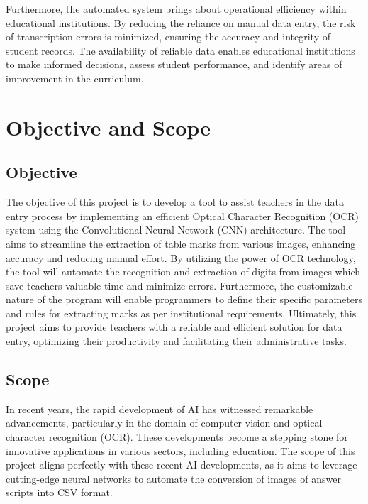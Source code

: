 \noindent Furthermore, the automated system brings about operational efficiency within educational institutions. By reducing the reliance on manual data entry, the risk of transcription errors is minimized, ensuring the accuracy and integrity of student records. The availability of reliable data enables educational institutions to make informed decisions, assess student performance, and identify areas of improvement in the curriculum.
\clearpage

\section{Objective and Scope}

\subsection{Objective}

The objective of this project is to develop a tool to assist teachers in the data entry process by implementing an efficient Optical Character Recognition (OCR) system using the Convolutional Neural Network (CNN) architecture. The tool aims to streamline the extraction of table marks from various images, enhancing accuracy and reducing manual effort. By utilizing the power of OCR technology, the tool will automate the recognition and extraction of digits from images which save teachers valuable time and minimize errors. Furthermore, the customizable nature of the program will enable programmers to define their specific parameters and rules for extracting marks as per institutional requirements. Ultimately, this project aims to provide teachers with a reliable and efficient solution for data entry, optimizing their productivity and facilitating their administrative tasks.

\subsection{Scope}

In recent years, the rapid development of AI has witnessed remarkable advancements, particularly in the domain of computer vision and optical character recognition (OCR). These developments become a stepping stone for innovative applications in various sectors, including education. The scope of this project aligns perfectly with these recent AI developments, as it aims to leverage cutting-edge neural networks to automate the conversion of images of answer scripts into CSV format.

